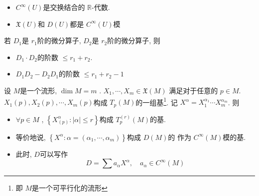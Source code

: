 \documentclass[../main.tex]{subfiles}
\begin{document}
  \begin{proposition}{}{}
    \begin{itemize}
        \item \(  C^{\infty}\left( U \right)   \)是交换结合的 \(  \mathbb{R}   \)-代数. 
        \item \(  \mathfrak{X}\left( U \right)   \)和 \(  D\left( U \right)   \)都是 \(  C^{\infty}\left( U \right)  \)模     
    \end{itemize}
    
  \end{proposition}

  \begin{proposition}{}{}
    若 \(  D_1  \)是 \(  r_1  \)阶的微分算子, \(  D_2  \)是 \(  r_2  \)阶的微分算子, 则 \begin{itemize}
        \item \(  D_1\cdot D_2  \)的阶数 \(  \le r_1+ r_2   \).        
        \item \(  D_1D_2-D_2D_1  \)的阶数 \(  \le r_1+ r_2-1  \)  
    \end{itemize}
    
  \end{proposition}

  \begin{theorem}{}{}
     设 \(  M  \)是一个流形, \(  \operatorname{dim} M = m  \) .  \(  X_1,\cdots ,X_{m}\in \mathfrak{X}\left( M \right)   \)  满足对于任意的 \(  p \in M  \). \(  X_1\left( p \right), X_2\left( p \right),\cdots , X_{m}\left( p \right)     \)构成 \(  T_{p}\left( M \right)   \)的一组基\footnote{即 \(  M  \)是一个可平行化的流形 }.    记 \(  X^{\alpha }= X_1^{\alpha _1 }\cdots X_{m}^{\alpha _{m}}  \). 则
   \begin{itemize}
    \item    \(  \forall p \in M  \) , \(  \left\{ X_{\left( p \right) }^{\alpha } :\left| \alpha  \right|\le r \right\}  \)构成 \(  T_{p}^{\left( r \right) }\left( M \right)   \)的基.   
    \item 等价地说, \(  \left\{ X^{\alpha }: \alpha = \left( \alpha _1 ,\cdots ,\alpha _{m} \right)  \right\}  \)构成 \(  D\left( M \right)   \)的   作为 \(  C^{\infty}\left( M \right)   \)模的基.  
    \item 此时, \(  D  \)可以写作 \[
    D= \sum  a_{\alpha }X^{\alpha } ,\quad a_{\alpha }\in C^{\infty}\left( M \right) 
    \] 
   \end{itemize}
   
  \end{theorem}
\end{document}
